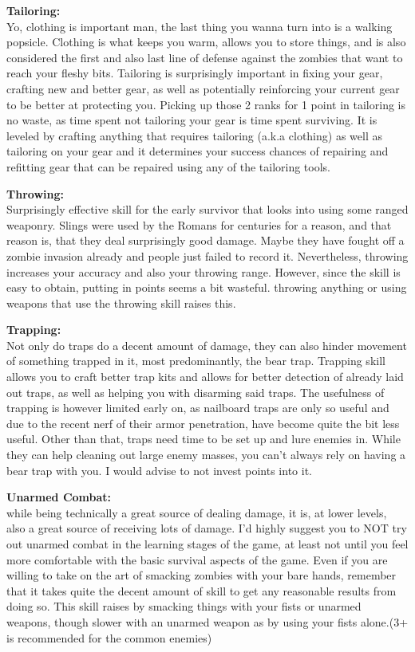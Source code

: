 \documentclass[11pt]{report}
\begin{document}
\textbf{Tailoring:}\\Yo, clothing is important man, the last thing you wanna turn into is a walking popsicle. Clothing is what keeps you warm, allows you to store things, and is also considered the first and also last line of defense against the zombies that want to reach your fleshy bits. Tailoring is surprisingly important in fixing your gear, crafting new and better gear, as well as potentially reinforcing your current gear to be better at protecting you. Picking up those 2 ranks for 1 point in tailoring is no waste, as time spent not tailoring your gear is time spent surviving. It is leveled by crafting anything that requires tailoring (a.k.a clothing) as well as tailoring on your gear and it determines your success chances of repairing and refitting gear that can be repaired using any of the tailoring tools.

\textbf{Throwing:}\\Surprisingly effective skill for the early survivor that looks into using some ranged weaponry. Slings were used by the Romans for centuries for a reason, and that reason is, that they deal surprisingly good damage. Maybe they have fought off a zombie invasion already and people just failed to record it. Nevertheless, throwing increases your accuracy and also your throwing range. However, since the skill is easy to obtain, putting in points seems a bit wasteful. throwing anything or using weapons that use the throwing skill raises this.

\textbf{Trapping:}\\Not only do traps do a decent amount of damage, they can also hinder movement of something trapped in it, most predominantly, the bear trap. Trapping skill allows you to craft better trap kits and allows for better detection of already laid out traps, as well as helping you with disarming said traps. The usefulness of trapping is however limited early on, as nailboard traps are only so useful and due to the recent nerf of their armor penetration, have become quite the bit less useful. Other than that, traps need time to be set up and lure enemies in. While they can help cleaning out large enemy masses, you can't always rely on having a bear trap with you. I would advise to not invest points into it.

\textbf{Unarmed Combat:}\\while being technically a great source of dealing damage, it is, at lower levels, also a great source of receiving lots of damage. I'd highly suggest you to NOT try out unarmed combat in the learning stages of the game, at least not until you feel more comfortable with the basic survival aspects of the game. Even if you are willing to take on the art of smacking zombies with your bare hands, remember that it takes quite the decent amount of skill to get any reasonable results from doing so. This skill raises by smacking things with your fists or unarmed weapons, though slower with an unarmed weapon as by using your fists alone.(3+ is recommended for the common enemies)
\end{document}
